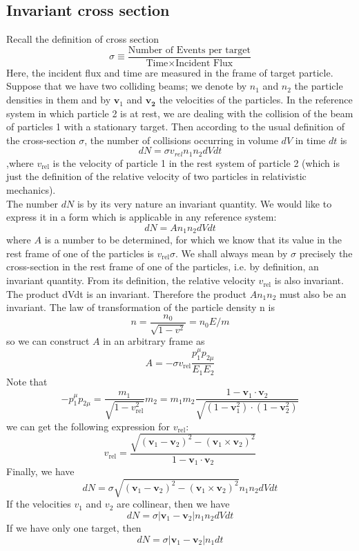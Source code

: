 \subsection{Invariant cross section}
Recall the definition of cross section
\[\sigma \equiv \frac{\mbox{Number of Events per target}}{\mbox{Time} \times \mbox{Incident Flux}}\]
Here, the incident flux and time are measured in the frame of target particle.\\
Suppose that we have two colliding beams; we denote by $n_1$ and $n_2$ the particle densities in them and by $\bm{v}_1$ and $\bm{v_2}$ the velocities of the particles. In the reference system in which particle 2 is at rest, we are dealing with the collision of the beam of particles 1 with a stationary target. Then according to the usual definition of the cross-section $\sigma$, the number of collisions occurring in volume $dV$ in time $dt$ is 
\[dN = \sigma v_{rel} n_1 n_2 dV dt\]
,where $v_{\mathrm{rel}}$ is the velocity of particle 1 in the rest system of particle 2 (which is just the definition of the relative velocity of two particles in relativistic mechanics). \\
The number $dN$ is by its very nature an invariant quantity. We would like to express it in a form which is applicable in any reference system: 
\[dN = A n_1 n_2 dV dt\] 
where $A$ is a number to be determined, for which we know that its value in the rest frame of one of the particles is $v_{\mathrm{rel}} \sigma$. We shall always mean by $\sigma$ precisely the cross-section in the rest frame of one of the particles, i.e. by definition, an invariant quantity. From its definition, the relative velocity $v_{\mathrm{rel}}$ is also invariant. The product dVdt is an invariant. Therefore the product $A n_1 n_2$ must also be an invariant. The law of transformation of the particle density n is
\[n = \frac{n_0}{\sqrt{1-v^2}} = n_0 E/m\]
so we can construct $A$ in an arbitrary frame as
\[A = -\sigma v_{\mathrm{rel}} \frac{p_1^{\mu}p_{2\mu}}{E_1 E_2}\]
Note that
\[-p_1^{\mu}p_{2\mu} = \frac{m_1}{\sqrt{1-v_{\mathrm{rel}}^2}}m_2 = m_1 m_2 \frac{1-\bm{v}_1\cdot\bm{v}_2}{\sqrt{(1-\bm{v}_1^2)\cdot(1-\bm{v}_2^2)}}\]
we can get the following expression for $v_{\mathrm{rel}}$:
\[v_{\mathrm{rel}} = \frac{\sqrt{(\bm{v}_1-\bm{v}_2)^2-(\bm{v}_1\times\bm{v}_2)^2}}{1-\bm{v}_1\cdot\bm{v}_2}\]
Finally, we have
\[dN = \sigma \sqrt{(\bm{v}_1-\bm{v}_2)^2-(\bm{v}_1\times\bm{v}_2)^2} n_1 n_2 dV dt\]
If the velocities $v_1$ and $v_2$ are collinear, then we have
\[dN = \sigma |\bm{v}_1 - \bm{v}_2| n_1 n_2 dV dt\]
If we have only one target, then
\[dN = \sigma |\bm{v}_1 - \bm{v}_2| n_1 dt\]

